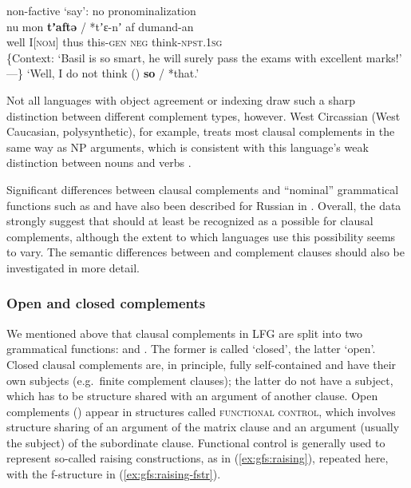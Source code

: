 \documentclass[output=paper]{../langscibook}
\begin{document}
    \ex\label{ex:gfs:moksha-say} non-factive `say': no pronominalization\\
    \gll nu mon \textbf{tʼaftə}{ /} *tʼɛ-nʼ af dumand-an\\
    well I[\textsc{nom}] thus \phantom{*}this-\textsc{gen} \textsc{neg} think-\textsc{npst.1sg}\\
    \glt \{Context: `Basil is so smart, he will surely pass the exams with excellent marks!' —\} `Well, I do not think (\SUBJ) \textbf{so} / *that.'
 \z
 
Not all languages with object agreement or indexing draw such a sharp distinction between different complement types, however. West Circassian (West Caucasian, polysynthetic), for example, treats most clausal complements in the same way as NP arguments, which is consistent with this language's weak distinction between nouns and verbs \citep{letuchiy2016}.

Significant differences between clausal complements and ``nominal'' grammatical functions such as \SUBJ and \OBJ have also been described for Russian in \citet{Letuchiy2012}. Overall, the data strongly suggest that \COMP should at least be recognized as a possible \GF for clausal complements, although the extent to which languages use this possibility seems to vary. The semantic differences between \OBJ and \COMP complement clauses should also be investigated in more detail.
 
 \subsubsection{Open and closed complements\label{sect:gfs:comp-xcomp}}
 
 We mentioned above that clausal complements in LFG are split into two grammatical functions: \COMP and \XCOMP. The former is called `closed', the latter `open'. Closed clausal complements are, in principle, fully self-contained and have their own subjects (e.g.\ finite complement clauses);  the latter do not have a subject, which has to be structure shared with an argument of another clause. Open complements (\XCOMP) appear in structures called \textsc{functional control}, which involves structure sharing of an argument of the matrix clause and an argument (usually the subject) of the subordinate clause. Functional control is generally used to represent so-called raising constructions, as in (\ref{ex:gfs:raising}), repeated here, with the f-structure in (\ref{ex:gfs:raising-fstr}).
 
\end{document}
